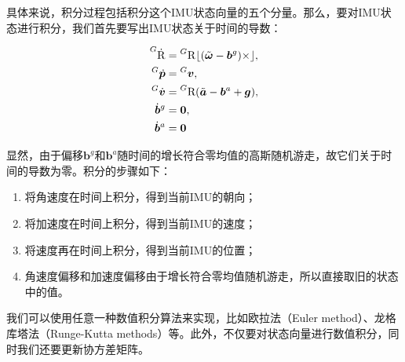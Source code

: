 具体来说，积分过程包括积分这个IMU状态向量的五个分量。那么，要对IMU状态进行积分，我们首先要写出IMU状态关于时间的导数：

\begin{equation}
\begin{aligned}
    \prescript{G}{}{\dot{\mathrm R}}
        &= \prescript{G}{}{\mathrm R} \lfloor(\tilde{\bm{\omega}} - \bm{b}^g)\times\rfloor, \\
    \prescript{G}{}{\dot{\bm p}}
        &= \prescript{G}{}{\bm v}, \\
    \prescript{G}{}{\dot{\bm v}}
        &= \prescript{G}{}{\mathrm R} (\tilde{\bm a} - \bm{b}^a + \bm{g}), \\
    \dot{\bm b}^g &= \bm{0}, \\
    \dot{\bm b}^a &= \bm{0}
\end{aligned}
\end{equation}

显然，由于偏移$\bm{b}^g$和$\bm{b}^a$随时间的增长符合零均值的高斯随机游走，故它们关于时间的导数为零。积分的步骤如下：

\begin{enumerate}
    \item 将角速度在时间上积分，得到当前IMU的朝向；
    \item 将加速度在时间上积分，得到当前IMU的速度；
    \item 将速度再在时间上积分，得到当前IMU的位置；
    \item 角速度偏移和加速度偏移由于增长符合零均值随机游走，所以直接取旧的状态中的值。
\end{enumerate}

我们可以使用任意一种数值积分算法来实现，比如欧拉法（Euler method）、龙格库塔法（Runge-Kutta methods）\citep{wiki2017runge}等。此外，不仅要对状态向量进行数值积分，同时我们还要更新协方差矩阵。

